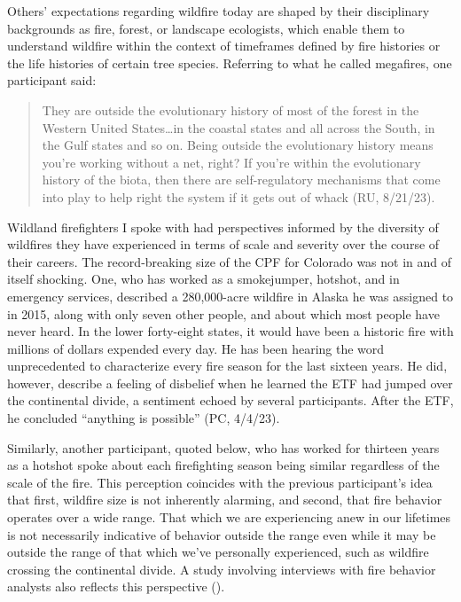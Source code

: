 \documentclass[
]{article}
\begin{document}
Others' expectations regarding wildfire today are shaped by their disciplinary backgrounds as fire, forest, or landscape ecologists, which enable them to understand wildfire within the context of timeframes defined by fire histories or the life histories of certain tree species. Referring to what he called megafires, one participant said:

\begin{quote}
They are outside the evolutionary history of most of the forest in the Western United States\ldots in the coastal states and all across the South, in the Gulf states and so on. Being outside the evolutionary history means you're working without a net, right? If you're within the evolutionary history of the biota, then there are self-regulatory mechanisms that come into play to help right the system if it gets out of whack (RU, 8/21/23).
\end{quote}

Wildland firefighters I spoke with had perspectives informed by the diversity of wildfires they have experienced in terms of scale and severity over the course of their careers. The record-breaking size of the CPF for Colorado was not in and of itself shocking. One, who has worked as a smokejumper, hotshot, and in emergency services, described a 280,000-acre wildfire in Alaska he was assigned to in 2015, along with only seven other people, and about which most people have never heard. In the lower forty-eight states, it would have been a historic fire with millions of dollars expended every day. He has been hearing the word unprecedented to characterize every fire season for the last sixteen years. He did, however, describe a feeling of disbelief when he learned the ETF had jumped over the continental divide, a sentiment echoed by several participants. After the ETF, he concluded ``anything is possible'' (PC, 4/4/23).

Similarly, another participant, quoted below, who has worked for thirteen years as a hotshot spoke about each firefighting season being similar regardless of the scale of the fire. This perception coincides with the previous participant's idea that first, wildfire size is not inherently alarming, and second, that fire behavior operates over a wide range. That which we are experiencing anew in our lifetimes is not necessarily indicative of behavior outside the range even while it may be outside the range of that which we've personally experienced, such as wildfire crossing the continental divide. A study involving interviews with fire behavior analysts also reflects this perspective ().
\end{document}
